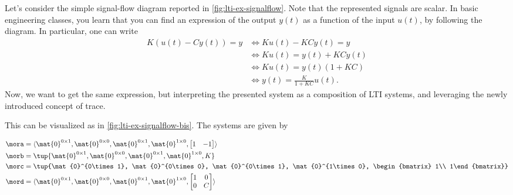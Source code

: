 \begin{example}
Let's consider the simple signal-flow diagram reported in \cref{fig:lti-ex-signalflow}.
Note that the represented signals are scalar.
In basic engineering classes, you learn that you can find an expression of the output $y(t)$ as a function of the input $u(t)$, by following the diagram.
In particular, one can write
\begin{equation*}
\begin{aligned}
K(u(t)-Cy(t))=y &\Leftrightarrow Ku(t)-KCy(t)=y\\
&\Leftrightarrow Ku(t)=y(t)+KCy(t)\\
&\Leftrightarrow Ku(t)=y(t)(1+KC)\\
&\Leftrightarrow y(t)=\frac{K}{1+KC}u(t).
\end{aligned}
\end{equation*}
Now, we want to get the same expression, but interpreting the presented system as a composition of LTI systems, and leveraging the newly introduced concept of trace.

This can be visualized as in \cref{fig:lti-ex-signalflow-bis}.
The systems are given by

\begin{equation*}
\begin{aligned}
\mora &= \langle\mat{0}^{0\times 1}, \mat{0}^{0\times 0}, \mat{0}^{0\times 1}, \mat{0}^{1\times 0}, \begin{bmatrix} {1} & {-1}\end{bmatrix}\rangle\\
\morb&=\tup{\mat{0}^{0\times 1}, \mat{0}^{0\times 0}, \mat{0}^{0\times 1}, \mat{0}^{1\times 0}, K}\\
\morc&=\tup{\mat{0}^{0\times 1}, \mat{0}^{0\times 0}, \mat{0}^{0\times 1}, \mat{0}^{1\times 0}, \begin{bmatrix} 1\\ 1\end{bmatrix}}\\
\mord&=\langle\mat{0}^{0\times 1}, \mat{0}^{0\times 0}, \mat{0}^{0\times 1}, \mat{0}^{1\times 0}, 
\begin{bmatrix}
    1&0\\
    0&C
    \end{bmatrix}\rangle
\end{aligned}
\end{equation*}


\end{example}
